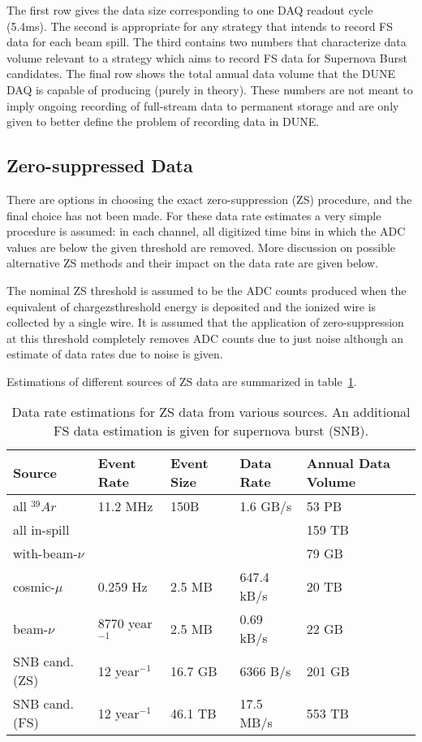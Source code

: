 The first row gives the data size corresponding to one DAQ readout cycle (5.4ms).
The second is appropriate for any strategy that intends to record FS data for each beam spill.
The third contains two numbers that characterize data volume relevant to a strategy which aims
to record FS data for Supernova Burst candidates. The final row  shows the total annual data
volume that the DUNE DAQ is capable of producing (purely in theory).
These numbers are not meant to imply ongoing recording of full-stream
data to permanent storage and are only given to better define the problem of recording data in DUNE.


\subsection{Zero-suppressed Data}

There are options in choosing the exact zero-suppression (ZS) procedure,
and the final choice has not been made. For these data rate estimates a very
simple procedure is assumed: in each channel, all digitized time bins in which the ADC
values are below the given threshold are removed. More discussion on possible alternative
ZS methods and their impact on the data rate are given below.

The nominal ZS threshold is assumed to be the ADC counts produced when
the equivalent of chargezsthreshold energy is deposited and the
ionized wire is collected by a single wire.
It is assumed that the application of zero-suppression at this
threshold completely removes ADC counts due to just noise although an
estimate of data rates due to noise is given.

Estimations of different sources of ZS data are summarized in table~\ref{tab:zs-volume}.

	
\begin{table}[ht!]
\centering
\begin{tabular}{| p{1.25in} | p{0.95in} | p{0.75in} | p{1in} | p{0.75in} |}		\hline		
Source & Event Rate & Event Size & Data Rate & Annual Data Volume \\ \hline
all $^{39}Ar$ & 11.2 MHz & 150B & 1.6 GB/s &  53 PB \\ \hline
all in-spill & & & & 159 TB \\ \hline
with-beam-$\nu$ & & & & 79 GB \\ \hline
cosmic-$\mu$ & 0.259 Hz &2.5 MB & 647.4 kB/s & 20 TB \\	\hline
beam-$\nu$ & 8770 year$^{-1}$ & 2.5 MB & 0.69 kB/s & 22 GB \\ \hline
SNB cand. (ZS) & 12 year$^{-1}$ & 16.7 GB & 6366 B/s & 201 GB \\ \hline
SNB cand. (FS) & 12 year$^{-1}$ & 46.1 TB & 17.5 MB/s & 553 TB \\ \hline
\end{tabular}
\caption{Data rate estimations for ZS data from various sources. An additional FS data estimation is given for supernova burst (SNB).}
\label{tab:zs-volume}
\end{table}


